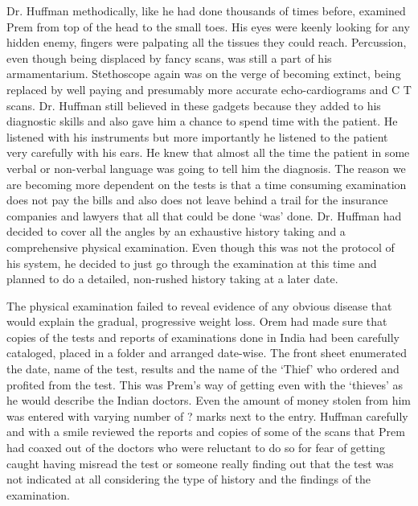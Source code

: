 Dr. Huffman methodically, like he had done thousands of times before,
examined Prem from top of the head to the small toes. His eyes were
keenly looking for any hidden enemy, fingers were palpating all the
tissues they could reach. Percussion, even though being displaced by
fancy scans, was still a part of his armamentarium. Stethoscope again
was on the verge of becoming extinct, being replaced by well paying and
presumably more accurate echo-cardiograms and C T scans. Dr. Huffman
still believed in these gadgets because they added to his diagnostic
skills and also gave him a chance to spend time with the patient. He
listened with his instruments but more importantly he listened to the
patient very carefully with his ears. He knew that almost all the time
the patient in some verbal or non-verbal language was going to tell him
the diagnosis. The reason we are becoming more dependent on the tests is
that a time consuming examination does not pay the bills and also does
not leave behind a trail for the insurance companies and lawyers that
all that could be done `was' done. Dr. Huffman had decided to cover all
the angles by an exhaustive history taking and a comprehensive physical
examination. Even though this was not the protocol of his system, he
decided to just go through the examination at this time and planned to
do a detailed, non-rushed history taking at a later date.

The physical examination failed to reveal evidence of any obvious
disease that would explain the gradual, progressive weight loss. Orem
had made sure that copies of the tests and reports of examinations done
in India had been carefully cataloged, placed in a folder and arranged
date-wise. The front sheet enumerated the date, name of the test,
results and the name of the `Thief' who ordered and profited from the
test. This was Prem's way of getting even with the `thieves' as he would
describe the Indian doctors. Even the amount of money stolen from him
was entered with varying number of ? marks next to the entry. Huffman
carefully and with a smile reviewed the reports and copies of some of
the scans that Prem had coaxed out of the doctors who were reluctant to
do so for fear of getting caught having misread the test or someone
really finding out that the test was not indicated at all considering
the type of history and the findings of the examination.

